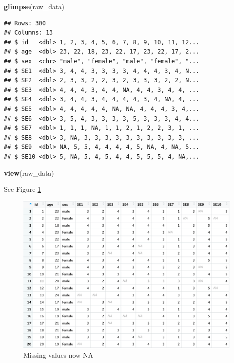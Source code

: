 \documentclass[
]{krantz}
\makeatletter
\newenvironment{Shaded}{\begin{snugshade}}{\end{snugshade}}
\newcommand{\KeywordTok}[1]{\textcolor[rgb]{0.27,0.27,0.27}{\textbf{#1}}}
\newcommand{\NormalTok}[1]{#1}
\newenvironment{kframe}{%
\medskip{}
\setlength{\fboxsep}{.8em}
 \def\at@end@of@kframe{}%
 \ifinner\ifhmode%
  \def\at@end@of@kframe{\end{minipage}}%
  \begin{minipage}{\columnwidth}%
 \fi\fi%
 \def\FrameCommand##1{\hskip\@totalleftmargin \hskip-\fboxsep
 \colorbox{shadecolor}{##1}\hskip-\fboxsep
     \hskip-\linewidth \hskip-\@totalleftmargin \hskip\columnwidth}%
 \MakeFramed {\advance\hsize-\width
   \@totalleftmargin\z@ \linewidth\hsize
   \@setminipage}}%
 {\par\unskip\endMakeFramed%
 \at@end@of@kframe}
\renewenvironment{Shaded}{\begin{kframe}}{\end{kframe}}
\makeatother
\begin{document}
\begin{Shaded}
\begin{Highlighting}[]
\KeywordTok{glimpse}\NormalTok{(raw_data)}
\end{Highlighting}
\end{Shaded}

\begin{verbatim}
## Rows: 300
## Columns: 13
## $ id   <dbl> 1, 2, 3, 4, 5, 6, 7, 8, 9, 10, 11, 12...
## $ age  <dbl> 23, 22, 18, 23, 22, 17, 23, 22, 17, 2...
## $ sex  <chr> "male", "female", "male", "female", "...
## $ SE1  <dbl> 3, 4, 4, 3, 3, 3, 3, 4, 4, 4, 3, 4, N...
## $ SE2  <dbl> 2, 3, 3, 2, 2, 3, 2, 3, 3, 3, 2, 2, N...
## $ SE3  <dbl> 4, 4, 4, 3, 4, 4, NA, 4, 4, 3, 4, 4, ...
## $ SE4  <dbl> 3, 4, 4, 3, 4, 4, 4, 4, 3, 4, NA, 4, ...
## $ SE5  <dbl> 4, 4, 4, 4, 4, NA, NA, 4, 4, 4, 3, 4,...
## $ SE6  <dbl> 3, 5, 4, 3, 3, 3, 3, 5, 3, 3, 3, 4, 4...
## $ SE7  <dbl> 1, 1, 1, NA, 1, 1, 2, 1, 2, 2, 3, 1, ...
## $ SE8  <dbl> 3, NA, 3, 3, 3, 3, 3, 3, 3, 3, 3, 3, ...
## $ SE9  <dbl> NA, 5, 5, 4, 4, 4, 4, 5, NA, 4, NA, 5...
## $ SE10 <dbl> 5, NA, 5, 4, 5, 4, 4, 5, 5, 5, 4, NA,...
\end{verbatim}

\begin{Shaded}
\begin{Highlighting}[]
\KeywordTok{view}\NormalTok{(raw_data)}
\end{Highlighting}
\end{Shaded}

See Figure \ref{fig:narawdataitems}

\begin{figure}
\includegraphics[width=0.85\linewidth]{ch_score_items/images/screenshot_raw_data_na} \caption{Missing values now NA}\label{fig:narawdataitems}
\end{figure}
\end{document}
